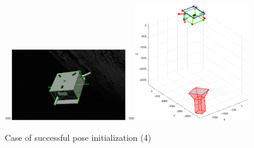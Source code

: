 \begin{figure}[htpb]
  =\hbox{\includegraphics[width=0.45\textwidth]{gfx/PoseDetermination/trial311modelMap.eps}}%
  =\hbox{\includegraphics[width=0.45\textwidth]{gfx/PoseDetermination/cameraWRTSC311.eps}}%
  {\,} \hfill
   \hfill
   \hfill
  {\,}
  \caption{Case of successful pose initialization (4)}
  \label{fig:EVVAI4}
\end{figure}